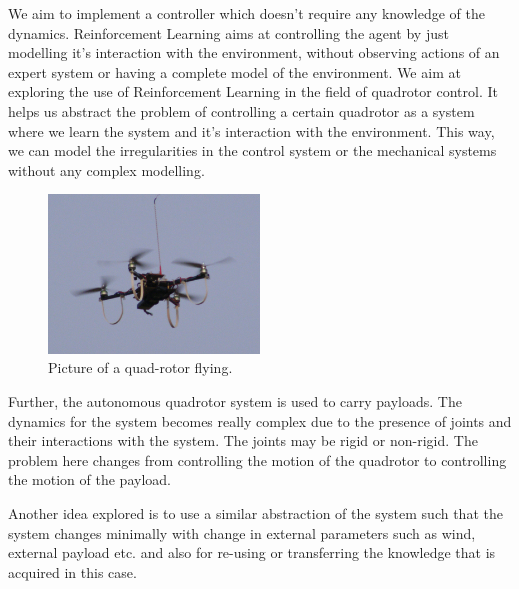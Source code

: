 \documentclass[hidelinks,BTech]{iitmdiss}
\begin{document}
We aim to implement a controller which doesn't require any knowledge of the dynamics. Reinforcement Learning aims at controlling the agent by just modelling it's interaction with the environment, without observing actions of an expert system or having a complete model of the environment. We aim at exploring the use of Reinforcement Learning in the field of quadrotor control. It helps us abstract the problem of controlling a certain quadrotor as a system where we learn the system and it's interaction with the environment. This way, we can model the irregularities in the control system or the mechanical systems without any complex modelling. 

\begin{figure}[H]
  \centering
    \includegraphics[width=0.5\textwidth]{quadrotor.jpg}
    \caption{Picture of a quad-rotor flying.}
\end{figure}

Further, the autonomous quadrotor system is used to carry payloads. The dynamics for the system becomes really complex due to the presence of joints and their interactions with the system. The joints may be rigid or non-rigid. The problem here changes from controlling the motion of the quadrotor to controlling the motion of the payload. 

Another idea explored is to use a similar abstraction of the system such that the system changes minimally with change in external parameters such as wind, external payload etc. and also for re-using or transferring the knowledge that is acquired in this case. 
\end{document}
